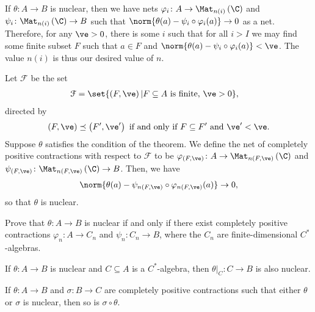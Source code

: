 \documentclass[10pt]{mypackage}
\begin{document}
\begin{solution}
  If $\theta\colon A\rightarrow B$ is nuclear, then we have nets $\varphi_i\colon A\rightarrow \Mat_{n(i)}\left( \C \right)$ and $\psi_i\colon \Mat_{n(i)}\left( \C \right)\rightarrow B$ such that $\norm{\theta(a) - \psi_i\circ \varphi_i(a)} \rightarrow 0$ as a net. Therefore, for any $\ve > 0$, there is some $i$ such that for all $i > I$ we may find some finite subset $F$ such that $a\in F$ and $\norm{\theta(a) - \psi_i\circ\varphi_i(a)} < \ve$. The value $n(i)$ is thus our desired value of $n$.\newline

  Let $\mathcal{F}$ be the set
  \begin{align*}
    \mathcal{F} &= \set{\left( F,\ve \right) | F\subseteq A\text{ is finite, }\ve > 0},
  \end{align*}
  directed by
  \begin{align*}
    \left( F,\ve \right) \preceq \left( F',\ve' \right) \text{ if and only if } F\subseteq F'\text{ and }\ve' < \ve.
  \end{align*}
  Suppose $\theta$ satisfies the condition of the theorem. We define the net of completely positive contractions with respect to $\mathcal{F}$ to be $\varphi_{(F,\ve)}\colon A\rightarrow \Mat_{n(F,\ve)}\left( \C \right)$ and $\psi_{(F,\ve)}\colon \Mat_{n(F,\ve)}\left( \C \right)\rightarrow B$. Then, we have
  \begin{align*}
    \norm{\theta(a) - \psi_{n(F,\ve)}\circ \varphi_{n(F,\ve)}(a)} \rightarrow 0,
  \end{align*}
  so that $\theta$ is nuclear.
\end{solution}
\begin{exercise}[Exercise 2.1.2]
  Prove that $\theta\colon A\rightarrow B$ is nuclear if and only if there exist completely positive contractions $\varphi_n\colon A\rightarrow C_n$ and $\psi_n\colon C_n\rightarrow B$, where the $C_n$ are finite-dimensional $C^{\ast}$-algebras.
\end{exercise}
\begin{exercise}[Exercise 2.1.3]
  If $\theta\colon A\rightarrow B$ is nuclear and $C\subseteq A$ is a $C^{\ast}$-algebra, then $\theta|_{C}\colon C\rightarrow B$ is also nuclear.
\end{exercise}
\begin{exercise}[Exercise 2.1.4]
  If $\theta\colon A\rightarrow B$ and $\sigma\colon B\rightarrow C$ are completely positive contractions such that either $\theta$ or $\sigma$ is nuclear, then so is $\sigma\circ\theta$.
\end{exercise}
\end{document}
